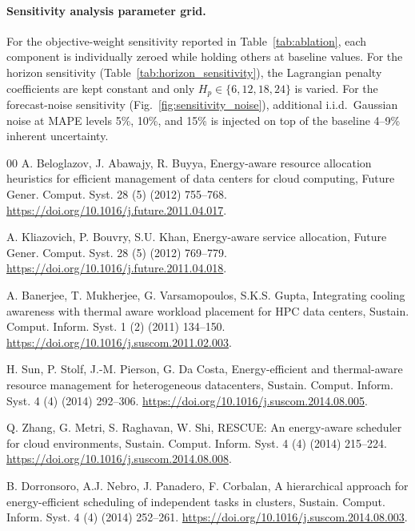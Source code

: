 \documentclass[a4paper,fleqn]{cas-dc}
\begin{document}
\paragraph{Sensitivity analysis parameter grid.}
For the objective-weight sensitivity reported in Table~\ref{tab:ablation}, each component is individually zeroed while holding others at baseline values. For the horizon sensitivity (Table~\ref{tab:horizon_sensitivity}), the Lagrangian penalty coefficients are kept constant and only $H_p \in \{6, 12, 18, 24\}$ is varied. For the forecast-noise sensitivity (Fig.~\ref{fig:sensitivity_noise}), additional i.i.d.\ Gaussian noise at MAPE levels 5\%, 10\%, and 15\% is injected on top of the baseline 4--9\% inherent uncertainty.


\begin{thebibliography}{00}
A. Beloglazov, J. Abawajy, R. Buyya, Energy-aware resource allocation heuristics for efficient management of data centers for cloud computing, Future Gener. Comput. Syst. 28 (5) (2012) 755--768. \url{https://doi.org/10.1016/j.future.2011.04.017}.

A. Kliazovich, P. Bouvry, S.U. Khan, Energy-aware service allocation, Future Gener. Comput. Syst. 28 (5) (2012) 769--779. \url{https://doi.org/10.1016/j.future.2011.04.018}.

A. Banerjee, T. Mukherjee, G. Varsamopoulos, S.K.S. Gupta, Integrating cooling awareness with thermal aware workload placement for HPC data centers, Sustain. Comput. Inform. Syst. 1 (2) (2011) 134--150. \url{https://doi.org/10.1016/j.suscom.2011.02.003}.

H. Sun, P. Stolf, J.-M. Pierson, G. Da Costa, Energy-efficient and thermal-aware resource management for heterogeneous datacenters, Sustain. Comput. Inform. Syst. 4 (4) (2014) 292--306. \url{https://doi.org/10.1016/j.suscom.2014.08.005}.

Q. Zhang, G. Metri, S. Raghavan, W. Shi, RESCUE: An energy-aware scheduler for cloud environments, Sustain. Comput. Inform. Syst. 4 (4) (2014) 215--224. \url{https://doi.org/10.1016/j.suscom.2014.08.008}.

B. Dorronsoro, A.J. Nebro, J. Panadero, F. Corbalan, A hierarchical approach for energy-efficient scheduling of independent tasks in clusters, Sustain. Comput. Inform. Syst. 4 (4) (2014) 252--261. \url{https://doi.org/10.1016/j.suscom.2014.08.003}.


\end{thebibliography}
\end{document}
